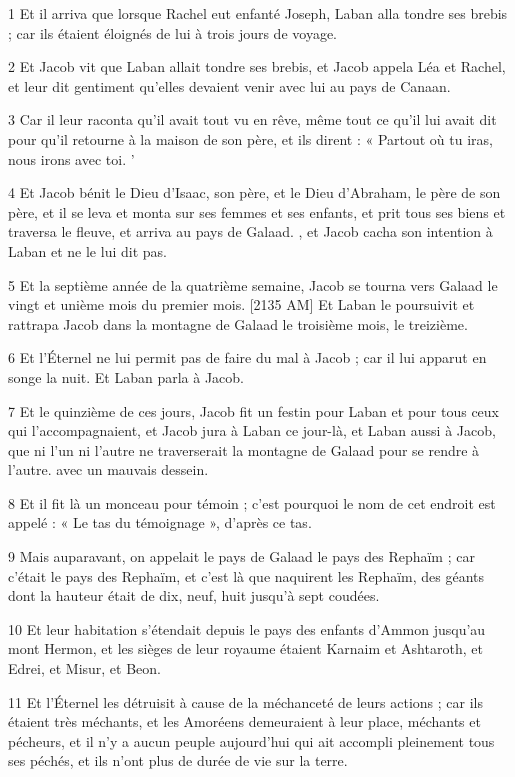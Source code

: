 \par 1 Et il arriva que lorsque Rachel eut enfanté Joseph, Laban alla tondre ses brebis ; car ils étaient éloignés de lui à trois jours de voyage.
\par 2 Et Jacob vit que Laban allait tondre ses brebis, et Jacob appela Léa et Rachel, et leur dit gentiment qu'elles devaient venir avec lui au pays de Canaan.
\par 3 Car il leur raconta qu'il avait tout vu en rêve, même tout ce qu'il lui avait dit pour qu'il retourne à la maison de son père, et ils dirent : « Partout où tu iras, nous irons avec toi. '
\par 4 Et Jacob bénit le Dieu d'Isaac, son père, et le Dieu d'Abraham, le père de son père, et il se leva et monta sur ses femmes et ses enfants, et prit tous ses biens et traversa le fleuve, et arriva au pays de Galaad. , et Jacob cacha son intention à Laban et ne le lui dit pas.
\par 5 Et la septième année de la quatrième semaine, Jacob se tourna vers Galaad le vingt et unième mois du premier mois. [2135 AM] Et Laban le poursuivit et rattrapa Jacob dans la montagne de Galaad le troisième mois, le treizième.
\par 6 Et l'Éternel ne lui permit pas de faire du mal à Jacob ; car il lui apparut en songe la nuit. Et Laban parla à Jacob.
\par 7 Et le quinzième de ces jours, Jacob fit un festin pour Laban et pour tous ceux qui l'accompagnaient, et Jacob jura à Laban ce jour-là, et Laban aussi à Jacob, que ni l'un ni l'autre ne traverserait la montagne de Galaad pour se rendre à l'autre. avec un mauvais dessein.
\par 8 Et il fit là un monceau pour témoin ; c'est pourquoi le nom de cet endroit est appelé : « Le tas du témoignage », d'après ce tas.
\par 9 Mais auparavant, on appelait le pays de Galaad le pays des Rephaïm ; car c'était le pays des Rephaïm, et c'est là que naquirent les Rephaïm, des géants dont la hauteur était de dix, neuf, huit jusqu'à sept coudées.
\par 10 Et leur habitation s'étendait depuis le pays des enfants d'Ammon jusqu'au mont Hermon, et les sièges de leur royaume étaient Karnaim et Ashtaroth, et Edrei, et Misur, et Beon.
\par 11 Et l'Éternel les détruisit à cause de la méchanceté de leurs actions ; car ils étaient très méchants, et les Amoréens demeuraient à leur place, méchants et pécheurs, et il n'y a aucun peuple aujourd'hui qui ait accompli pleinement tous ses péchés, et ils n'ont plus de durée de vie sur la terre.
